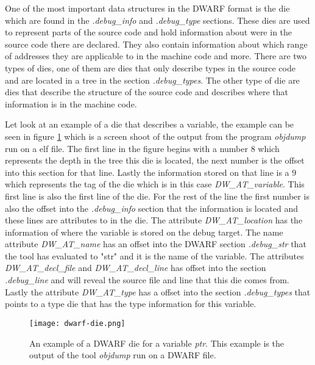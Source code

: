  


One of the most important data structures in the \gls{DWARF} format is the \gls{die} which are found in the \emph{.debug\_info} and \emph{.debug\_type} sections.
These \glspl{die} are used to represent parts of the source code and hold information about were in the source code there are declared.
They also contain information about which range of addresses they are applicable to in the machine code and more.
There are two types of \glspl{die}, one of them are dies that only describe types in the source code and are located in a \gls{tree} in the section \emph{.debug\_types}.
The other type of \gls{die} are dies that describe the structure of the source code and describes where that information is in the machine code.


Let look at an example of a \gls{die} that describes a variable, the example can be seen in figure \ref{fig:dwarfdie} which is a screen shoot of the output from the program \emph{objdump} run on a \gls{elf} file.
The first line in the figure begins with a number $8$ which represents the depth in the tree this \gls{die} is located, the next number is the offset into this section for that line.
Lastly the information stored on that line is a $9$ which represents the tag of the \gls{die} which is in this case \emph{DW\_AT\_variable}.
This first line is also the first line of the die.
For the rest of the line the first number is also the offset into the \emph{.debug\_info} section that the information is located and these lines are attributes to in the \gls{die}.
The attribute \emph{DW\_AT\_location} has the information of where the variable is stored on the debug target.
The name attribute \emph{DW\_AT\_name} has an offset into the \gls{DWARF} section \emph{.debug\_str} that the tool has evaluated to "str" and it is the name of the variable.
The attributes \emph{DW\_AT\_decl\_file} and \emph{DW\_AT\_decl\_line} has offset into the section \emph{.debug\_line} and will reveal the source file and line that this \gls{die} comes from.
Lastly the attribute \emph{DW\_AT\_type} has a offset into the section \emph{.debug\_types} that points to a type \gls{die} that has the type information for this variable.


\begin{figure}[h]
	\centering
	\texttt{[image: dwarf-die.png]}
	\caption{An example of a \gls{DWARF} \gls{die} for a variable \emph{ptr}. This example is the output of the tool \emph{objdump} run on a \gls{DWARF} file.}
	\label{fig:dwarfdie}
\end{figure}

